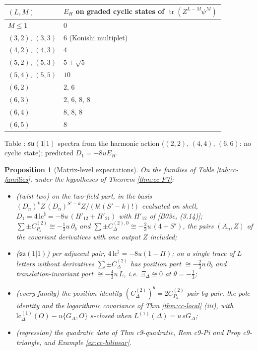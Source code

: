 \documentclass[11pt]{article}
\numberwithin{equation}{section}
\theoremstyle{plain}
\newtheorem{proposition}[theorem]{Proposition}
\theoremstyle{definition}
\begin{document}
\begin{center}\small
\begin{tabular}{l|l}
$(L,M)$ & $E_H$ on graded cyclic states of $\operatorname{tr}(Z^{L-M}\psi^M)$\\\hline
$M\le1$ & $0$\\
$(3,2)$, $(3,3)$ & $6$ (Konishi multiplet)\\
$(4,2)$, $(4,3)$ & $4$\\
$(5,2)$, $(5,3)$ & $5\pm\sqrt5$\\
$(5,4)$, $(5,5)$ & $10$\\
$(6,2)$ & $2$, $6$\\
$(6,3)$ & $2$, $6$, $8$, $8$\\
$(6,4)$ & $8$, $8$, $8$\\
$(6,5)$ & $8$\\
\end{tabular}
\end{center}
\begin{center}\small Table \theequation\label{tab:cc-su11}: $\mathfrak{su}(1|1)$ spectra from the harmonic action ($(2,2)$, $(4,4)$, $(6,6)$: no cyclic state); predicted $D_1=-8uE_H$.\end{center}

\begin{proposition}[Matrix-level expectations]
\label{prop:cc-matrix}
On the families of Table \ref{tab:cc-families}, under the hypotheses of Theorem \ref{thm:cc-P7}:
\begin{itemize}
\item[(i)] (twist two) on the two-field part, in the basis $(D_n)^kZ\,(D_n)^{S'-k}Z/(k!(S'-k)!)$ evaluated on shell, $D_1=4\,\mathrm{lc}^\natural=-8u\,(H'_{12}+H'_{21})$ with $H'_{12}$ of [B03c, (3.14)]; $\sum\pm C^{(2)}_{P_b}\cong-\tfrac13u\,\partial_b$ and $\sum\pm C^{(2),0}_\Delta\cong-\tfrac23u\,(4+S')$, the pairs $(A_n,Z)$ of the covariant derivatives with one output $Z$ included;
\item[(ii)] ($\mathfrak{su}(1|1)$) per adjacent pair, $4\,\mathrm{lc}^\natural=-8u(1-\Pi)$; on a single trace of $L$ letters without derivatives $\sum\pm C^{(2)}_\Delta$ has position part $\cong-\tfrac23u\,\partial_b$ and translation-invariant part $\cong-\tfrac43u\,L$, i.e. $\Xi_\Delta\cong0$ at $\theta=-\tfrac13$;
\item[(iii)] (every family) the position identity $(C^{(2)}_\Delta)^b=2C^{(2)}_{P_b}$ pair by pair, the pole identity and the logarithmic covariance of Thm \ref{thm:cc-local} (iii), with $\mathrm{lc}^{(1)}_\Delta(O)-u\{G_\Delta,O\}$ $s$-closed when $L^{(1)}(\Delta)=u\,sG_\Delta$;
\item[(iv)] (regression) the quadratic data of Thm c9-quadratic, Rem c9-Pi and Prop c9-triangle, and Example \ref{ex:cc-bilinear}.
\end{itemize}
\end{proposition}
\end{document}
